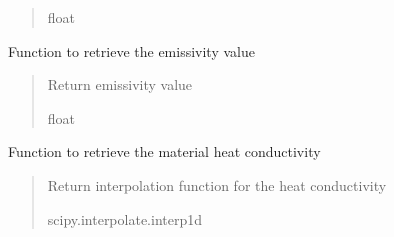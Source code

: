 \documentclass[letterpaper,10pt,english]{sphinxmanual}
\begin{document}
\begin{fulllineitems}
\begin{fulllineitems}
\begin{quote}
\begin{description}
\sphinxAtStartPar
float

\end{description}\end{quote}

\end{fulllineitems}


\begin{fulllineitems}
\label{\detokenize{modules:material.Material.material_emissivity}}
\pysigstartsignatures
{}
\pysigstopsignatures
\sphinxAtStartPar
Function to retrieve the emissivity value
\begin{quote}\begin{description}
\sphinxAtStartPar
{} \textendash{} Return emissivity value

\sphinxAtStartPar
float

\end{description}\end{quote}

\end{fulllineitems}


\begin{fulllineitems}
\label{\detokenize{modules:material.Material.material_heatConductivity}}
\pysigstartsignatures
{}
\pysigstopsignatures
\sphinxAtStartPar
Function to retrieve the material heat conductivity
\begin{quote}\begin{description}
\sphinxAtStartPar
{} \textendash{} Return interpolation function for the heat conductivity

\sphinxAtStartPar
scipy.interpolate.interp1d

\end{description}\end{quote}

\end{fulllineitems}


\end{fulllineitems}
\end{document}
